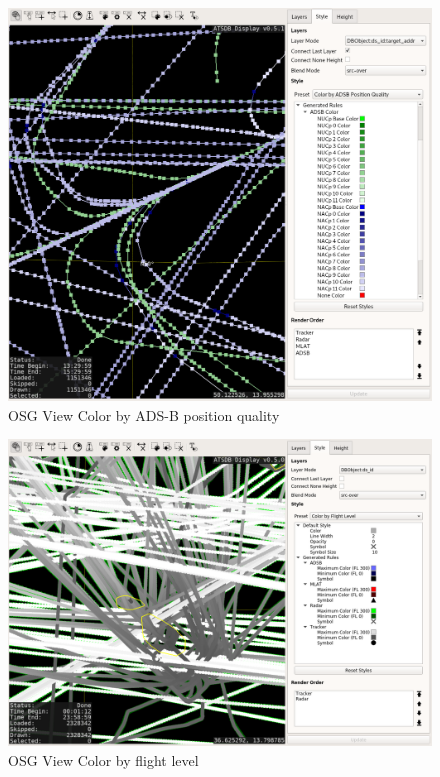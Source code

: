 \begin{figure}[H]
    \hspace*{-2.5cm}
    \includegraphics[width=19cm,frame]{figures/osgview_style_adsb_position_qual.png}
  \caption{OSG View Color by ADS-B position quality}
\end{figure}

\begin{figure}[H]
    \hspace*{-2.5cm}
    \includegraphics[width=19cm,frame]{figures/osgview_style_flight_level.png}
  \caption{OSG View Color by flight level}
\end{figure}

